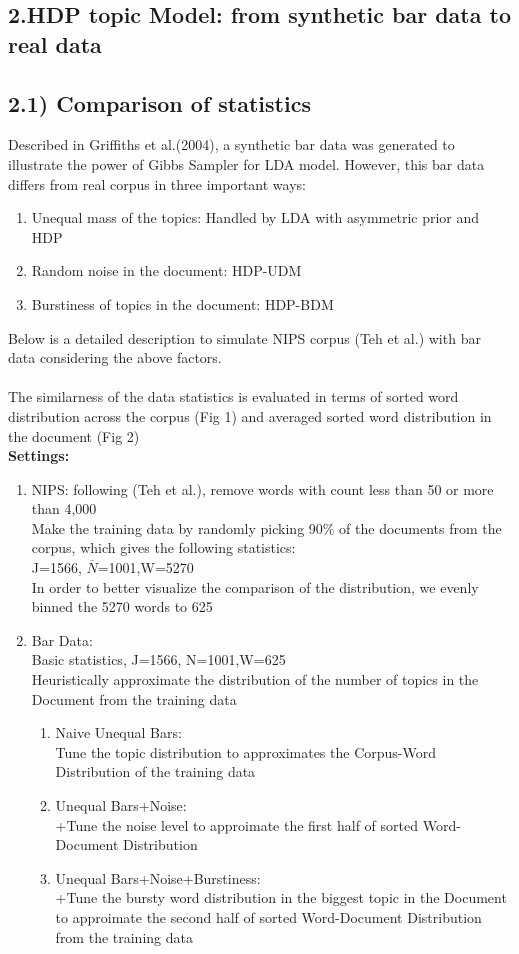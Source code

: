 \documentclass{article}
\begin{document}
\begin{spacing}{1.1}
\section{2.HDP topic Model: from synthetic bar data to real data}
\subsection{2.1) Comparison of statistics}
Described in Griffiths et al.(2004), a synthetic bar data was generated to 
illustrate the power of Gibbs Sampler for LDA model.
However, this bar data differs from real corpus in three important ways:\\
\begin{enumerate}
 \item Unequal mass of the topics: Handled by LDA with asymmetric prior and HDP
 \item Random noise in the document: HDP-UDM
 \item Burstiness of topics in the document: HDP-BDM
\end{enumerate}
Below is a detailed description to simulate NIPS corpus (Teh et al.) with
bar data considering the above factors.\\\\
The similarness of the data statistics is evaluated in terms of
sorted word distribution across the corpus (Fig 1) 
and averaged sorted word distribution in the document (Fig 2) \\
{\bf Settings:}
\begin{enumerate}
 \item NIPS: following (Teh et al.), remove words with count less than 50 or more than 4,000\\
Make the training data by randomly picking 90\% of the documents from the corpus, which gives the following statistics:\\
J=1566, $\overline{N}$=1001,W=5270 \\
In order to better visualize the comparison of the distribution, we evenly binned the 5270 words to 625
 \item Bar Data:\\
Basic statistics, J=1566, N=1001,W=625\\
Heuristically approximate the distribution of the number of topics in the Document from the training data
\begin{enumerate}
 \item Naive Unequal Bars:\\
Tune the topic distribution to approximates 
the Corpus-Word Distribution of the training data
 \item Unequal Bars+Noise: \\
+Tune the noise level to approimate the first half of sorted Word-Document Distribution
 \item Unequal Bars+Noise+Burstiness:\\
+Tune the bursty word distribution in the biggest topic in the Document to approimate the second half of sorted Word-Document Distribution
from the training data
\end{enumerate}
\end{enumerate}


\end{spacing}
\end{document}
